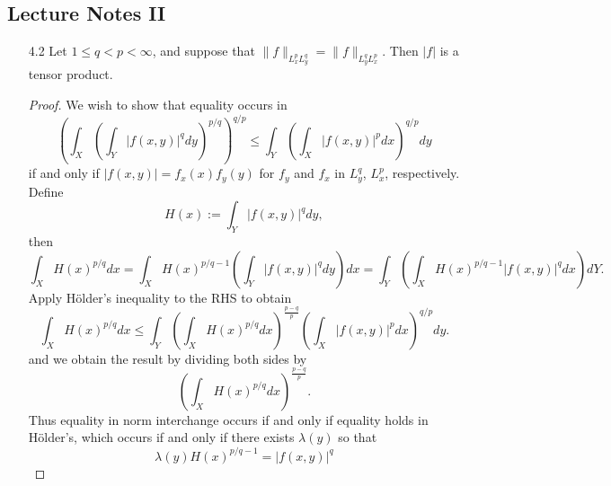\documentclass[11pt]{article}
\theoremstyle{remark}
\newcommand{\1}{\textbf{1}}
\def\norm#1{\| #1  \|}
\begin{document}
\subsection*{Lecture Notes II}
\begin{enumerate}
\item[4.2] Let $1 \leq q < p < \infty$, and suppose that $\norm{f}_{L^p_x L^q_y} = \norm{f}_{L^q_y L^p_x}$. Then $|f|$ is a tensor product.
\begin{proof}
We wish to show that equality occurs in
\[
\left( \int_X \left( \int_Y |f(x,y)|^q dy \right)^{p/q} \right)^{q/p} \leq \int_Y \left( \int_X |f(x,y)|^p dx \right)^{q/p} dy 
\]
if and only if $|f(x,y)| = f_x(x) f_y(y)$ for $f_y$ and $f_x$ in $L^q_y$, $L^p_x$, respectively.
Define
\[
H(x):= \int_Y |f(x,y)|^q dy,
\]
then
\[
\int_X H(x)^{p/q} dx = \int_X H(x)^{p/q - 1} \left(\int_Y |f(x,y)|^q dy\right) dx = \int_Y  \left(\int_X H(x)^{p/q - 1}|f(x,y)|^q dx\right) dY.
\]
Apply H\"older's inequality to the RHS to obtain
\[
\int_X H(x)^{p/q} dx \leq \int_Y \left( \int_X H(x)^{p/q} dx \right)^{\frac{p-q}{p}} \left( \int_X |f(x,y)|^p dx\right)^{q/p} dy.
\]
and we obtain the result by dividing both sides by 
\[
\left( \int_X H(x)^{p/q} dx \right)^{\frac{p-q}{p}}.
\]
Thus equality in norm interchange occurs if and only if equality holds in H\"older's, which occurs if and only if there exists $\lambda(y)$ so that
\[
\lambda(y) H(x)^{p/q - 1} = |f(x,y)|^q
\]


\end{proof}
\end{enumerate}
\end{document}
